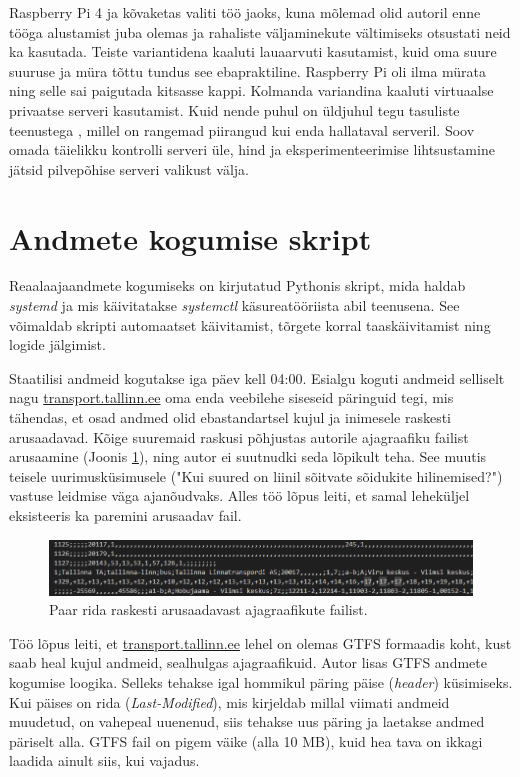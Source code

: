 Raspberry Pi 4 ja kõvaketas valiti töö jaoks, kuna mõlemad olid autoril enne tööga alustamist juba olemas ja rahaliste väljaminekute vältimiseks otsustati neid ka kasutada. Teiste variantidena kaaluti lauaarvuti kasutamist, kuid oma suure suuruse ja müra tõttu tundus see ebapraktiline. Raspberry Pi oli ilma mürata ning selle sai paigutada kitsasse kappi. Kolmanda variandina kaaluti virtuaalse privaatse serveri kasutamist. Kuid nende puhul on üldjuhul tegu tasuliste teenustega \cite{Hetzner2025}, millel on rangemad piirangud kui enda hallataval serveril. Soov omada täielikku kontrolli serveri üle, hind ja eksperimenteerimise lihtsustamine jätsid pilvepõhise serveri valikust välja.



\section{Andmete kogumise skript} %
Reaalaajaandmete kogumiseks on kirjutatud Pythonis skript, mida haldab \textit{systemd} ja mis käivitatakse \textit{systemctl} käsureatööriista abil teenusena. See võimaldab skripti automaatset käivitamist, tõrgete korral taaskäivitamist ning logide jälgimist.

Staatilisi andmeid kogutakse iga päev kell 04:00. Esialgu koguti andmeid selliselt nagu \url{transport.tallinn.ee} oma enda veebilehe siseseid päringuid tegi, mis tähendas, et osad andmed olid ebastandartsel kujul ja inimesele raskesti arusaadavad. Kõige suuremaid raskusi põhjustas autorile ajagraafiku failist arusaamine (Joonis \ref{fig:Ajagraafikute}), ning autor ei suutnudki seda lõpikult teha. See muutis teisele uurimusküsimusele ("Kui suured on liinil sõitvate sõidukite hilinemised?") vastuse leidmise väga ajanõudvaks. Alles töö lõpus leiti, et samal leheküljel eksisteeris ka paremini arusaadav fail.


 \begin{figure}[h!]
    \centering
    \includegraphics[width=1\textwidth]{figures/arusaamatud andmed.png}
    \caption{Paar rida raskesti arusaadavast ajagraafikute failist.}
    \label{fig:Ajagraafikute}
\end{figure}
 
Töö lõpus leiti, et \url{transport.tallinn.ee} lehel on olemas GTFS formaadis koht, kust saab heal kujul andmeid, sealhulgas ajagraafikuid. Autor lisas GTFS andmete kogumise loogika.  Selleks tehakse igal hommikul päring päise (\textit{header}) küsimiseks. Kui päises on rida (\textit{Last-Modified}), mis kirjeldab millal viimati andmeid muudetud, on vahepeal uuenenud, siis tehakse uus päring ja laetakse andmed päriselt alla. GTFS fail on  pigem väike (alla 10 MB), kuid hea tava on ikkagi laadida ainult siis, kui vajadus.

